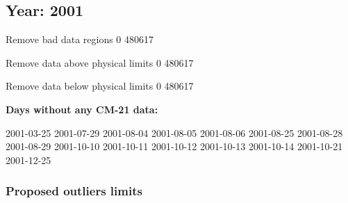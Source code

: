 \documentclass[
  10pt,
  a4paper,oneside]{article}
\begin{document}
\FloatBarrier

\newpage

\hypertarget{year-2001}{%
\subsection{Year: 2001}\label{year-2001}}

Remove bad data regions
0 480617

Remove data above physical limits
0 480617

Remove data below physical limits
0 480617

\textbf{Days without any CM-21 data:}

2001-03-25 2001-07-29 2001-08-04 2001-08-05 2001-08-06 2001-08-25 2001-08-28 2001-08-29 2001-10-10 2001-10-11 2001-10-12 2001-10-13 2001-10-14 2001-10-21 2001-12-25

\hypertarget{proposed-outliers-limits-8}{%
\subsubsection{Proposed outliers limits}\label{proposed-outliers-limits-8}}

\footnotesize
\end{document}
